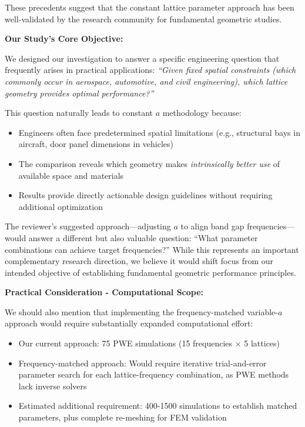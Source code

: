 \documentclass[11pt,a4paper]{article}
\newenvironment{responsebox}{%
    \par\medskip\noindent{\color{responsecolor}\rule{\linewidth}{2pt}}\par
    \noindent{\color{responsecolor}\bfseries Response}\par\smallskip
}{%
    \par\noindent{\color{responsecolor}\rule{\linewidth}{0.5pt}}\medskip
}
\begin{document}
\begin{responsebox}
These precedents suggest that the constant lattice parameter approach has been well-validated by the research community for fundamental geometric studies.

\textbf{Our Study's Core Objective:}

We designed our investigation to answer a specific engineering question that frequently arises in practical applications: \textit{``Given fixed spatial constraints (which commonly occur in aerospace, automotive, and civil engineering), which lattice geometry provides optimal performance?''}

This question naturally leads to constant $a$ methodology because:

\begin{itemize}
    \item Engineers often face predetermined spatial limitations (e.g., structural bays in aircraft, door panel dimensions in vehicles)
    \item The comparison reveals which geometry makes \textit{intrinsically better use} of available space and materials
    \item Results provide directly actionable design guidelines without requiring additional optimization
\end{itemize}

The reviewer's suggested approach---adjusting $a$ to align band gap frequencies---would answer a different but also valuable question: ``What parameter combinations can achieve target frequencies?'' While this represents an important complementary research direction, we believe it would shift focus from our intended objective of establishing fundamental geometric performance principles.

\textbf{Practical Consideration - Computational Scope:}

We should also mention that implementing the frequency-matched variable-$a$ approach would require substantially expanded computational effort:

\begin{itemize}
    \item Our current approach: 75 PWE simulations (15 frequencies $\times$ 5 lattices)
    \item Frequency-matched approach: Would require iterative trial-and-error parameter search for each lattice-frequency combination, as PWE methods lack inverse solvers
    \item Estimated additional requirement: 400-1500 simulations to establish matched parameters, plus complete re-meshing for FEM validation
\end{itemize}


\end{responsebox}
\end{document}
